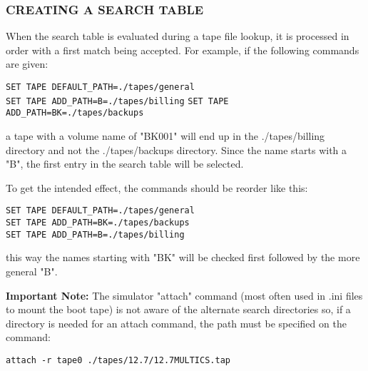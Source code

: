 \subsubsection[Creating a Search Table]{CREATING A SEARCH TABLE}

When the search table is evaluated during a tape file lookup, it is processed in order with a first
match being accepted. For example, if the following commands are given:

\begin{adjustwidth}{5ex}{1ex}
	\texttt{SET TAPE DEFAULT\_PATH=./tapes/general} \\
	\texttt{SET TAPE ADD\_PATH=B=./tapes/billing}
	\texttt{SET TAPE ADD\_PATH=BK=./tapes/backups} \\
\end{adjustwidth}

a tape with a volume name of "BK001" will end up in the ./tapes/billing directory and not the
./tapes/backups directory. Since the name starts with a "B", the first entry in the search table
will be selected.

To get the intended effect, the commands should be reorder like this:

\begin{adjustwidth}{5ex}{1ex}
	\texttt{SET TAPE DEFAULT\_PATH=./tapes/general} \\
	\texttt{SET TAPE ADD\_PATH=BK=./tapes/backups} \\
	\texttt{SET TAPE ADD\_PATH=B=./tapes/billing}
\end{adjustwidth}

this way the names starting with "BK" will be checked first followed by the more general "B".

\textbf{Important Note:} The simulator "attach" command (most often used in .ini files to mount
the boot tape) is not aware of the alternate search directories so, if a directory is needed for
an attach command, the path must be specified on the command:

\begin{adjustwidth}{5ex}{1ex}
	\texttt{attach -r tape0 ./tapes/12.7/12.7MULTICS.tap}
\end{adjustwidth}


